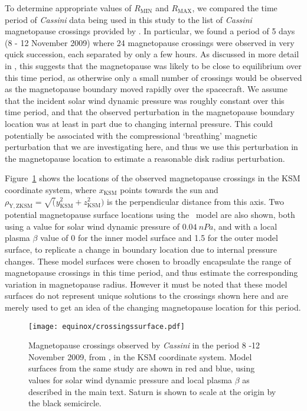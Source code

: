 To determine appropriate values of $R_\mathrm{MIN}$ and $R_\mathrm{MAX}$, we compared the time period of \textit{Cassini} data being used in this study to the list of \textit{Cassini} magnetopause crossings provided by \citet{pilkington2015}. In particular, we found a period of 5 days (8 - 12 November 2009) where 24 magnetopause crossings were observed in very quick succession, each separated by only a few hours. As discussed in more detail in \citet{pilkington2015}, this suggests that the magnetopause was likely to be close to equilibrium over this time period, as otherwise only a small number of crossings would be observed as the magnetopause boundary moved rapidly over the spacecraft. We assume that the incident solar wind dynamic pressure was roughly constant over this time period, and that the observed perturbation in the magnetopause boundary location was at least in part due to changing internal pressure. This could potentially be associated with the compressional `breathing' magnetic perturbation that we are investigating here, and thus we use this perturbation in the magnetopause location to estimate a reasonable disk radius perturbation.

Figure~\ref{equinox:fig:crossingssurface} shows the locations of the observed magnetopause crossings in the KSM coordinate system, where $x_\mathrm{KSM}$ points towards the sun and $\rho_\mathrm{Y,ZKSM} = \sqrt(y_\mathrm{KSM}^2 + z_\mathrm{KSM}^2)$ is the perpendicular distance from this axis. Two potential magnetopause surface locations using the~\citet{pilkington2015} model are also shown, both using a value for solar wind dynamic pressure of $\SI{0.04}{nPa}$, and with a local plasma $\beta$ value of 0 for the inner model surface and 1.5 for the outer model surface, to replicate a change in boundary location due to internal pressure changes. These model surfaces were chosen to broadly encapsulate the range of magnetopause crossings in this time period, and thus estimate the corresponding variation in magnetopause radius. However it must be noted that these model surfaces do not represent unique solutions to the crossings shown here and are merely used to get an idea of the changing magnetopause location for this period.
\begin{figure}
\centering
\texttt{[image: equinox/crossingssurface.pdf]}
\caption[Magnetopause crossings observed by \textit{Cassini}, and model magnetopause surfaces.]{Magnetopause crossings observed by \textit{Cassini} in the period 8 -12 November 2009, from \citet{pilkington2015}, in the KSM coordinate system. Model surfaces from the same study are shown in red and blue, using values for solar wind dynamic pressure and local plasma $\beta$ as described in the main text. Saturn is shown to scale at the origin by the black semicircle.}
\label{equinox:fig:crossingssurface}
\end{figure}

